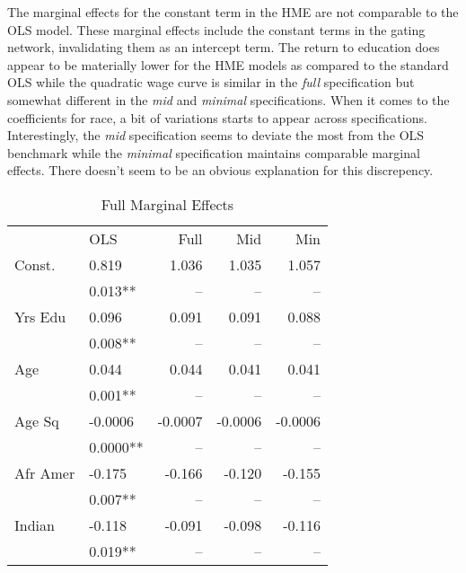 \documentclass[12pt]{article}
\begin{document}
The marginal effects for the constant term in the HME are not comparable
to the OLS model. These marginal effects include the constant terms in the
gating network, invalidating them as an intercept term. The return to
education does appear to be materially lower for the HME models as
compared to the standard OLS while the quadratic wage curve is similar
in the \textit{full} specification but somewhat different in the
\textit{mid} and \textit{minimal} specifications. When it comes to
the coefficients for race, a bit of variations starts to appear
across specifications. Interestingly, the \textit{mid} specification
seems to deviate the most from the OLS benchmark while the
\textit{minimal} specification maintains comparable marginal effects.
There doesn't seem to be an obvious explanation for this discrepency. 

\begin{table} \centering
  \caption{Full Marginal Effects}
  \begin{threeparttable}
    \begin{tabular}[l]{l l r r r}
      \cmidrule{1-5}

                  & OLS      & Full    & Mid     & Min    \\
      \cmidrule{1-5}

      Const.      & 0.819    &  1.036  & 1.035   & 1.057  \\
                  & 0.013**  &  --     & --      & --     \\[0.3cm]
      
      Yrs Edu     & 0.096    & 0.091   & 0.091   & 0.088  \\
                  & 0.008**  & --      & --      & --     \\[0.3cm]

      Age         & 0.044    & 0.044   & 0.041   & 0.041  \\
                  & 0.001**  & --      & --      & --     \\[0.3cm]

      Age Sq      & -0.0006  & -0.0007 & -0.0006 & -0.0006\\
                  & 0.0000** & --      & --      & --     \\[0.3cm]

      Afr Amer    & -0.175   & -0.166  & -0.120  & -0.155 \\
                  & 0.007**  & --      & --      & --     \\[0.3cm]

      Indian      & -0.118   & -0.091  & -0.098  & -0.116 \\
                  & 0.019**  & --      & --      & --     \\[0.3cm]


\end{tabular}
\end{threeparttable}
\end{table}
\end{document}

